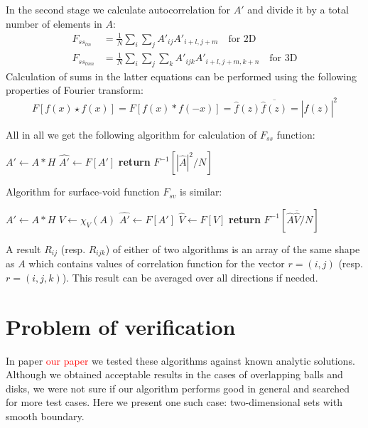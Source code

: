\documentclass[reprint,amsmath,amssymb,aps,pre,showkeys,showpacs]{revtex4-1}
\begin{document}
In the second stage we calculate autocorrelation for $A'$ and divide it by a
total number of elements in $A$:
\begin{align*}
  F_{{ss}_{lm}} &= \frac{1}{N} \sum_i \sum_j A'_{ij}A'_{i+l, j+m} \quad
  \text{for 2D} \\
  F_{{ss}_{lmn}} &= \frac{1}{N} \sum_i \sum_j \sum_k A'_{ijk}A'_{i+l, j+m, k+n}
  \quad \text{for 3D}
\end{align*}
Calculation of sums in the latter equations can be performed using the following
properties of Fourier transform:
\begin{equation*}
  F[f(x) \star f(x)] = F[f(x) * f(-x)] = \hat{f}(z)\overline{\hat{f}(z)} = |\hat{f}(z)|^2
\end{equation*}

All in all we get the following algorithm for calculation of $F_{ss}$ function:
\begin{algorithmic}[1]
  \State $A' \gets A*H$
  \State $\hat{A'} \gets F[A']$
  \State \textbf{return} $F^{-1}[ |\hat{A}|^2 / N]$
  \EndProcedure
\end{algorithmic}

Algorithm for surface-void function $F_{sv}$ is similar:
\begin{algorithmic}[1]
  \State $A' \gets A*H$
  \State $V \gets \chi_V(A)$
  \State $\hat{A'} \gets F[A']$
  \State $\hat{V} \gets F[V]$
  \State \textbf{return} $F^{-1}[ \hat{A}\overline{\hat{V}} / N]$
  \EndProcedure
\end{algorithmic}

A result $R_{ij}$ (resp. $R_{ijk}$) of either of two algorithms is an array of
the same shape as $A$ which contains values of correlation function for the
vector $r = (i, j)$ (resp. $r = (i, j, k)$). This result can be averaged over
all directions if needed.

\section{Problem of verification}
\label{sec:verify}
In paper \textcolor{red}{our paper} we tested these algorithms against known
analytic solutions. Although we obtained acceptable results in the cases of
overlapping balls and disks, we were not sure if our algorithm performs good in
general and searched for more test cases. Here we present one such case:
two-dimensional sets with smooth boundary.
\end{document}
